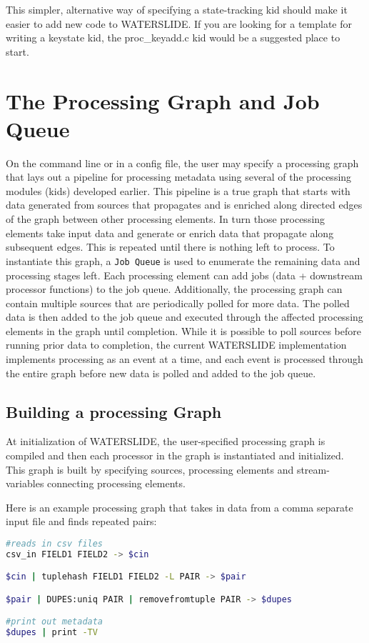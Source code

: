 \documentclass[11pt]{article}
\begin{document}
This simpler, alternative way of specifying a state-tracking kid should make it
easier to add new code to WATERSLIDE.  If you are looking for a template for 
writing a keystate kid, the proc\_keyadd.c kid would be a suggested place to 
start. 

\section{The Processing Graph and Job Queue}
On the command line or in a config file, the user may specify a processing 
graph that lays out a pipeline for processing metadata using several of the 
processing modules (kids) developed earlier.  This pipeline is a true graph 
that starts with data generated from sources that propagates and is enriched 
along directed edges of the graph between other processing elements. In turn 
those processing elements take input data and generate or enrich data that 
propagate along subsequent edges. This is repeated until there is nothing left 
to process. To instantiate this graph, a \texttt{Job Queue} is used to 
enumerate the remaining data and  processing stages left.  Each processing 
element can add jobs (data + downstream processor functions) to the job queue.
Additionally, the processing graph can 
contain multiple sources that are periodically polled for more data.  The 
polled data is then added to the job queue and executed through the affected 
processing elements in the graph until completion.  While it is possible to 
poll sources before running prior data to completion, the current WATERSLIDE 
implementation implements processing as an event at a time, and each event is 
processed through the entire graph before new data is polled and added to the 
job queue.

\subsection{Building a processing Graph}
At initialization of WATERSLIDE, the user-specified processing graph is compiled 
and then each processor in the graph is instantiated and initialized. This 
graph is built by specifying sources, processing elements and stream-variables
connecting processing elements.  

Here is an example processing graph that takes in data from a comma separate input file and finds
repeated pairs:

\begin{lstlisting}[language=bash]
#reads in csv files
csv_in FIELD1 FIELD2 -> $cin

$cin | tuplehash FIELD1 FIELD2 -L PAIR -> $pair

$pair | DUPES:uniq PAIR | removefromtuple PAIR -> $dupes

#print out metadata
$dupes | print -TV
\end{lstlisting}
\end{document}
